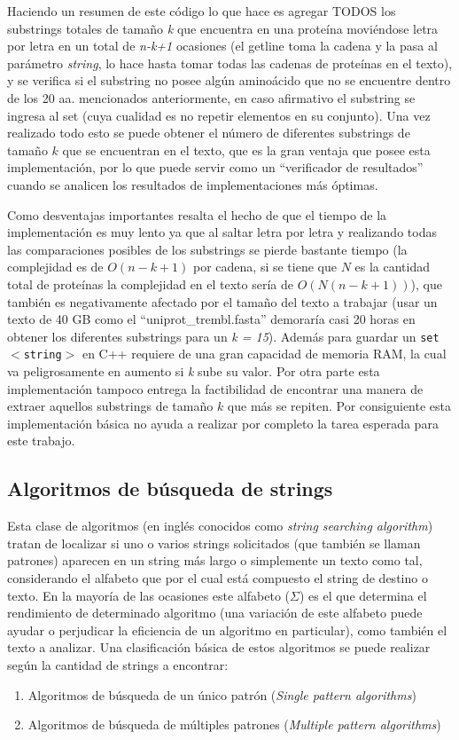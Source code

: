 Haciendo un resumen de este código lo que hace es agregar TODOS los substrings totales de tamaño \textit{k} que encuentra en una proteína moviéndose letra por letra en un total de \textit{n-k+1} ocasiones (el getline toma la cadena y la pasa al parámetro \textit{string}, lo hace hasta tomar todas las cadenas de proteínas en el texto), y se verifica si el substring no posee algún aminoácido que no se encuentre dentro de los 20 aa. mencionados anteriormente, en caso afirmativo el substring se ingresa al set (cuya cualidad es no repetir elementos en su conjunto). Una vez realizado todo esto se puede obtener el número de diferentes substrings de tamaño $k$ que se encuentran en el texto, que es la gran ventaja que posee esta implementación, por lo que puede servir como un ``verificador de resultados'' cuando se analicen los resultados de implementaciones más óptimas.

Como desventajas importantes resalta el hecho de que el tiempo de la implementación es muy lento ya que al saltar letra por letra y realizando todas las comparaciones posibles de los substrings se pierde bastante tiempo (la complejidad es de $O(n-k+1)$ por cadena, si se tiene que $N$ es la cantidad total de proteínas la complejidad en el texto sería de $O(N(n-k+1))$), que también es negativamente afectado por el tamaño del texto a trabajar (usar un texto de 40 GB como el ``uniprot\_trembl.fasta'' demoraría casi 20 horas en obtener los diferentes substrings para un \textit{k = 15}). Además para guardar un \texttt{set$<$string$>$} en C++ requiere de una gran capacidad de memoria RAM, la cual va peligrosamente en aumento si \textit{k} sube su valor. Por otra parte esta implementación tampoco entrega la factibilidad de encontrar una manera de extraer aquellos substrings de tamaño $k$ que más se repiten. Por consiguiente esta implementación básica no ayuda a realizar por completo la tarea esperada para este trabajo. 


\subsection{Algoritmos de búsqueda de strings}

Esta clase de algoritmos (en inglés conocidos como \textit{string searching algorithm}) tratan de localizar si uno o varios strings solicitados (que también se llaman patrones) aparecen en un string más largo o simplemente un texto como tal, considerando el alfabeto que por el cual está compuesto el string de destino o texto. En la mayoría de las ocasiones este alfabeto ($\Sigma$) es el que determina el rendimiento de determinado algoritmo (una variación de este alfabeto puede ayudar o perjudicar la eficiencia de un algoritmo en particular), como también el texto a analizar.
Una clasificación básica de estos algoritmos se puede realizar según la cantidad de strings a encontrar:
\begin{enumerate}
\item Algoritmos de búsqueda de un único patrón (\textit{Single pattern algorithms})
\item Algoritmos de búsqueda de múltiples patrones (\textit{Multiple pattern algorithms})
\end{enumerate}

